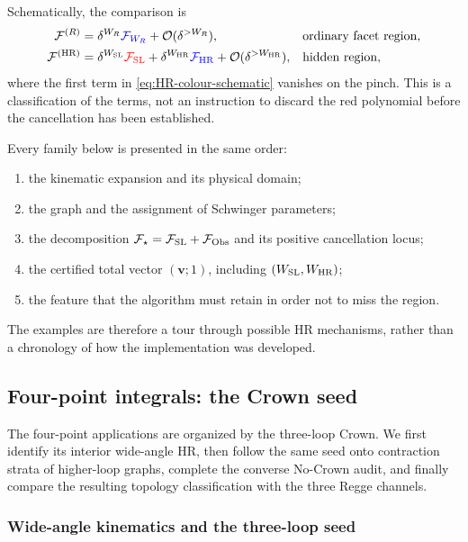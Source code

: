 \documentclass[a4paper,11pt]{article}
\newcommand{\HR}{\mathrm{HR}}
\newcommand{\FSL}{\mathcal F_{\rm SL}}
\newcommand{\FObs}{\mathcal F_{\rm Obs}}
\newcommand{\WSL}{W_{\rm SL}}
\newcommand{\WHR}{W_{\rm HR}}
\newcommand{\SLcolour}[1]{{\color{red}#1}}
\newcommand{\HRcolour}[1]{{\color{blue}#1}}
\newcommand{\Othercolour}[1]{{\color{black}#1}}
\begin{document}
Schematically, the comparison is
\begin{align}
 \mathcal F^{(R)}
 &=\delta^{W_R}\HRcolour{\mathcal F_{W_R}}
   +\Othercolour{\mathcal O(\delta^{>W_R})},
 &&\text{ordinary facet region},
\label{eq:facet-colour-schematic}\\
 \mathcal F^{(\HR)}
 &=\delta^{\WSL}\SLcolour{\FSL}
   +\delta^{\WHR}\HRcolour{\mathcal F_{\HR}}
   +\Othercolour{\mathcal O(\delta^{>\WHR})},
 &&\text{hidden region},
\label{eq:HR-colour-schematic}
\end{align}
where the first term in \eqref{eq:HR-colour-schematic} vanishes on the pinch.
This is a classification of the terms, not an instruction to discard the
red polynomial before the cancellation has been established.

Every family below is presented in the same order:
\begin{enumerate}[label=(\roman*)]
 \item the kinematic expansion and its physical domain;
 \item the graph and the assignment of Schwinger parameters;
 \item the decomposition \(\mathcal F_\star=\FSL+\FObs\) and its positive
 cancellation locus;
 \item the certified total vector \((\boldsymbol v;1)\), including
 \((\WSL,\WHR)\);
 \item the feature that the algorithm must retain in order not to miss the
 region.
\end{enumerate}
The examples are therefore a tour through possible HR mechanisms, rather
than a chronology of how the implementation was developed.

\subsection{Four-point integrals: the Crown seed}
\label{sec:example-crown}

The four-point applications are organized by the three-loop Crown.  We first
identify its interior wide-angle HR, then follow the same seed onto
contraction strata of higher-loop graphs, complete the converse No-Crown
audit, and finally compare the resulting topology classification with the
three Regge channels.

\subsubsection{Wide-angle kinematics and the three-loop seed}
\end{document}

